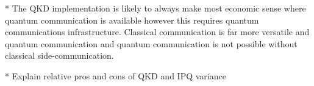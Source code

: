 * The QKD implementation is likely to always make most economic sense where quantum communication is available however this requires quantum communications infrastructure. Classical communication is far more versatile and quantum communication and quantum communication is not possible without classical side-communication.

* Explain relative pros and cons of QKD and IPQ variance 

%
%
%
%
%


%
%
%
%

